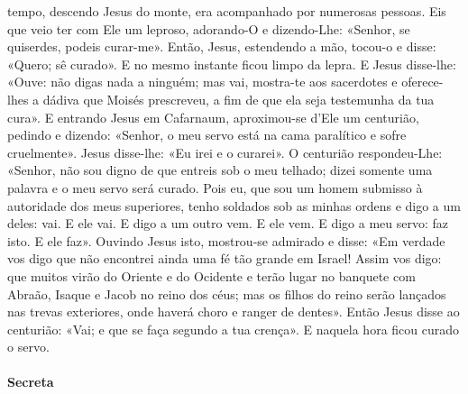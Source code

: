 \begin{paracol}{2}
{ tempo, descendo Jesus do monte, era acompanhado por numerosas pessoas. Eis que veio ter com Ele um leproso, adorando-O e dizendo-Lhe: «Senhor, se quiserdes, podeis curar-me». Então, Jesus, estendendo a mão, tocou-o e disse: «Quero; sê curado». E no mesmo instante ficou limpo da lepra. E Jesus disse-lhe: «Ouve: não digas nada a ninguém; mas vai, mostra-te aos sacerdotes e oferece-lhes a dádiva que Moisés prescreveu, a fim de que ela seja testemunha da tua cura». E entrando Jesus em Cafarnaum, aproximou-se d’Ele um centurião, pedindo e dizendo: «Senhor, o meu servo está na cama paralítico e sofre cruelmente». Jesus disse-lhe: «Eu irei e o curarei». O centurião respondeu-Lhe: «Senhor, não sou digno de que entreis sob o meu telhado; dizei somente uma palavra e o meu servo será curado. Pois eu, que sou um homem submisso à autoridade dos meus superiores, tenho soldados sob as minhas ordens e digo a um deles: vai. E ele vai. E digo a um outro vem. E ele vem. E digo a meu servo: faz isto. E ele faz». Ouvindo Jesus isto, mostrou-se admirado e disse: «Em verdade vos digo que não encontrei ainda uma fé tão grande em Israel! Assim vos digo: que muitos virão do Oriente e do Ocidente e terão lugar no banquete com Abraão, Isaque e Jacob no reino dos céus; mas os filhos do reino serão lançados nas trevas exteriores, onde haverá choro e ranger de dentes». Então Jesus disse ao centurião: «Vai; e que se faça segundo a tua crença». E naquela hora ficou curado o servo.
}\end{paracol}

\begin{paracol}{2}\switchcolumn{}\end{paracol}

\paragraph{Secreta}
\begin{paracol}{2}\switchcolumn{}\end{paracol}

